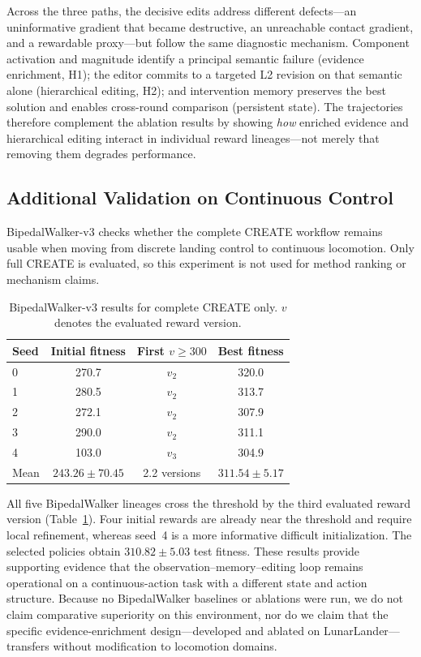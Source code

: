 Across the three paths, the decisive edits address different defects---an uninformative gradient that became destructive, an unreachable contact gradient, and a rewardable proxy---but follow the same diagnostic mechanism. Component activation and magnitude identify a principal semantic failure (evidence enrichment, H1); the editor commits to a targeted L2 revision on that semantic alone (hierarchical editing, H2); and intervention memory preserves the best solution and enables cross-round comparison (persistent state). The trajectories therefore complement the ablation results by showing \emph{how} enriched evidence and hierarchical editing interact in individual reward lineages---not merely that removing them degrades performance.

\subsection{Additional Validation on Continuous Control}
\label{sec:continuous_control}

BipedalWalker-v3 checks whether the complete CREATE workflow remains usable when moving from discrete landing control to continuous locomotion. Only full CREATE is evaluated, so this experiment is not used for method ranking or mechanism claims.

\begin{table}[t]
\caption{BipedalWalker-v3 results for complete CREATE only. $v$ denotes the evaluated reward version.}
\label{tab:bipedal}
\centering
\scriptsize
\setlength{\tabcolsep}{3.0pt}
\begin{tabular}{lccc}
\toprule
Seed & Initial fitness & First $v\!\geq\!300$ & Best fitness \\
\midrule
0 & 270.7 & $v_2$ & 320.0 \\
1 & 280.5 & $v_2$ & 313.7 \\
2 & 272.1 & $v_2$ & 307.9 \\
3 & 290.0 & $v_2$ & 311.1 \\
4 & 103.0 & $v_3$ & 304.9 \\
\midrule
Mean & $243.26\pm70.45$ & 2.2 versions & $311.54\pm5.17$ \\
\bottomrule
\end{tabular}
\end{table}

All five BipedalWalker lineages cross the threshold by the third evaluated reward version (Table~\ref{tab:bipedal}). Four initial rewards are already near the threshold and require local refinement, whereas seed~4 is a more informative difficult initialization. The selected policies obtain $310.82\pm5.03$ test fitness. These results provide supporting evidence that the observation--memory--editing loop remains operational on a continuous-action task with a different state and action structure. Because no BipedalWalker baselines or ablations were run, we do not claim comparative superiority on this environment, nor do we claim that the specific evidence-enrichment design---developed and ablated on LunarLander---transfers without modification to locomotion domains.

